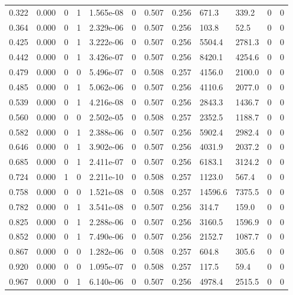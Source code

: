 \documentclass[preview]{standalone}
\begin{document}
{{\begin{tabular}{L{1.2cm}C{1.2cm} C{0.3cm}C{0.5cm} C{1.4cm}C{1.4cm} C{1.4cm}C{1.4cm} C{1.6cm}C{1.6cm} C{1.6cm}C{1.6cm}}
  0.322  &  0.000  & 0     &  1 &  1.565e-08  & 0  &  0.507&   0.256& 671.3 & 339.2   &  0 & 0  \\ 
  0.364  &  0.000  & 0     &  1 &  2.329e-06  & 0  &  0.507&   0.256& 103.8 & 52.5   &  0 & 0  \\ 
  0.425  &  0.000  & 0     &  1 &  3.222e-06  & 0  &  0.507&   0.256& 5504.4 & 2781.3   &  0 & 0  \\ 
  0.442  &  0.000  & 0     &  1 &  3.426e-07  & 0  &  0.507&   0.256& 8420.1 & 4254.6   &  0 & 0  \\ 
  0.479  &  0.000  & 0     &  0 &  5.496e-07  & 0  &  0.508&   0.257& 4156.0 & 2100.0   &  0 & 0  \\ 
  0.485  &  0.000  & 0     &  1 &  5.062e-06  & 0  &  0.507&   0.256& 4110.6 & 2077.0   &  0 & 0  \\ 
  0.539  &  0.000  & 0     &  1 &  4.216e-08  & 0  &  0.507&   0.256& 2843.3 & 1436.7   &  0 & 0  \\ 
  0.560  &  0.000  & 0     &  0 &  2.502e-05  & 0  &  0.508&   0.257& 2352.5 & 1188.7   &  0 & 0  \\ 
  0.582  &  0.000  & 0     &  1 &  2.388e-06  & 0  &  0.507&   0.256& 5902.4 & 2982.4   &  0 & 0  \\ 
  0.646  &  0.000  & 0     &  1 &  3.902e-06  & 0  &  0.507&   0.256& 4031.9 & 2037.2   &  0 & 0  \\ 
  0.685  &  0.000  & 0     &  1 &  2.411e-07  & 0  &  0.507&   0.256& 6183.1 & 3124.2   &  0 & 0  \\ 
  0.724  &  0.000  & 1     &  0 &  2.211e-10  & 0  &  0.508&   0.257& 1123.0 & 567.4   &  0 & 0  \\ 
  0.758  &  0.000  & 0     &  0 &  1.521e-08  & 0  &  0.508&   0.257& 14596.6 & 7375.5   &  0 & 0  \\ 
  0.782  &  0.000  & 0     &  1 &  3.541e-08  & 0  &  0.507&   0.256& 314.7 & 159.0   &  0 & 0  \\ 
  0.825  &  0.000  & 0     &  1 &  2.288e-06  & 0  &  0.507&   0.256& 3160.5 & 1596.9   &  0 & 0  \\ 
  0.852  &  0.000  & 0     &  1 &  7.490e-06  & 0  &  0.507&   0.256& 2152.7 & 1087.7   &  0 & 0  \\ 
  0.867  &  0.000  & 0     &  0 &  1.282e-06  & 0  &  0.508&   0.257& 604.8 & 305.6   &  0 & 0  \\ 
  0.920  &  0.000  & 0     &  0 &  1.095e-07  & 0  &  0.508&   0.257& 117.5 & 59.4   &  0 & 0  \\ 
  0.967  &  0.000  & 0     &  1 &  6.140e-06  & 0  &  0.507&   0.256& 4978.4 & 2515.5   &  0 & 0  \\ 

\end{tabular}}}
\end{document}
